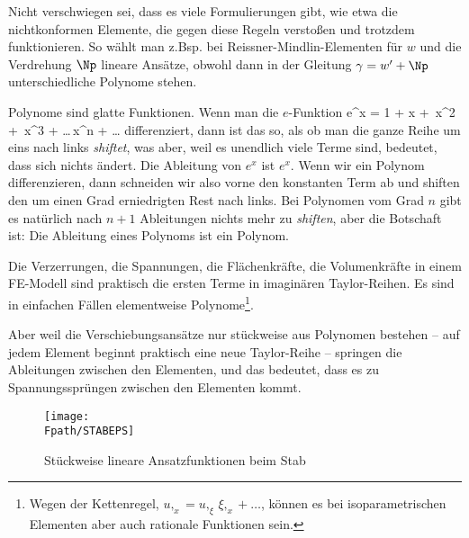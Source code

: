 Nicht verschwiegen sei, dass es viele Formulierungen gibt, wie etwa die nichtkonformen
Elemente, die gegen diese Regeln versto{\ss}en und trotzdem funktionieren. So w\"{a}hlt man
z.Bsp. bei Reissner-Mindlin-Elementen f\"{u}r $w$ und die Verdrehung $\Np$ lineare Ans\"{a}tze,
obwohl dann in der Gleitung $\gamma = w' + \Np$ unterschiedliche Polynome stehen.

Polynome sind glatte Funktionen. Wenn man die $e$-Funktion
\bfoo
e^x = 1 + x + \,x^2 + \,x^3 + \ldots {}\,x^n + \ldots
\efoo
differenziert, dann ist das so, als ob man die ganze Reihe um eins nach links {\em
shiftet\/}, was aber, weil es unendlich viele Terme sind, bedeutet, dass sich nichts
\"{a}ndert. Die Ableitung von $e^x$ ist $e^x$. Wenn wir ein Polynom differenzieren, dann
schneiden wir also vorne den konstanten Term ab und shiften den um einen Grad
erniedrigten Rest nach links. Bei Polynomen vom Grad $n$ gibt es nat\"{u}rlich nach $n+1$
Ableitungen nichts mehr zu {\em shiften\/}, aber die Botschaft ist: Die Ableitung eines
Polynoms ist ein Polynom.

Die Verzerrungen, die Spannungen, die Fl\"{a}chenkr\"{a}fte, die Volumenkr\"{a}fte in einem FE-Modell
sind praktisch die ersten Terme in imagin\"{a}ren Taylor-Reihen. Es sind in einfachen F\"{a}llen
elementweise Polynome\footnote{Wegen der Kettenregel, $u,_x = u,_\xi \, \xi,_x + \ldots $, k\"{o}nnen
es bei isoparametrischen Elementen aber auch rationale Funktionen sein.}.

Aber weil die Verschiebungsans\"{a}tze nur st\"{u}ckweise aus Polynomen bestehen -- auf jedem
Element beginnt praktisch eine neue Taylor-Reihe -- springen die Ableitungen zwischen
den Elementen, und das bedeutet, dass es zu Spannungsspr\"{u}ngen zwischen den Elementen
kommt.
\begin{figure}[tbp]
\if {} \sidecaption \fi
\texttt{[image: \\Fpath/STABEPS]}
\caption{St\"{u}ckweise lineare Ansatzfunktionen beim Stab} \label{StabEps}
\end{figure}%

